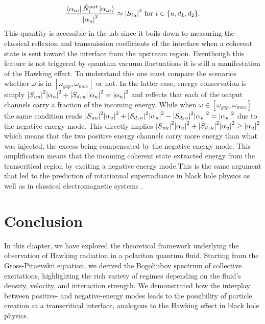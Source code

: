 \begin{equation}
    \dfrac{\bra{\alpha_{in}}\hat{N}_i^{out}\ket{\alpha_{in}}}{\abs{\alpha_u}^2} \approx \abs{S_{i u}}^2 \ \mathrm{for} \ i\in\{u,d_1,d_2\}.
\end{equation}
This quantity is accessible in the lab since it boils down to measuring the classical reflexion and transmission coefficients of the interface when a
coherent state is sent toward the interface from the upstream region. Eventhough this feature is not triggered by quantum vacuum 
fluctuations it is still a manifestation of the Hawking effect. To understand this one must compare the scenarios
whether $\omega$ is in $[\omega_{gap}, \omega_{max}]$ or not. In the latter case, energy conservation is simply $\abs{S_{uu}}^2\abs{\alpha_u}^2+\abs{S_{d_1u}}\abs{\alpha_u}^2=\abs{\alpha_u}^2$ and reflects that each of the output channels
carry a fraction of the incoming energy. While when $\omega \in [\omega_{gap}, \omega_{max}]$ the same condition reads $\abs{S_{uu}}^2\abs{\alpha_u}^2+\abs{S_{d_1u}}^2\abs{\alpha_u}^2-\abs{S_{d_2u}}^2\abs{\alpha_u}^2=\abs{\alpha_u}^2$ due to the negative energy mode.
This directly implies $\abs{S_{uu}}^2\abs{\alpha_u}^2+\abs{S_{d_1u}}^2\abs{\alpha_u}^2\geq \abs{\alpha_u}^2$ which means that the two positive energy channels
carry more energy than what was injected, the excess being compensated by the negative energy mode. This amplification means that the incoming 
coherent state extracted energy from the transcritical region by exciting a negative energy mode.This is the same 
argument that led to the prediction of rotationnal superradiance in black hole physics \cite{hawking_black_1972} as well as in classical electromagnetic systems \cite{zeldovich__1970}.

\section{Conclusion}

In this chapter, we have explored the theoretical framework underlying the observation of Hawking radiation in a polariton quantum fluid. Starting from the Gross-Pitaevskii equation, we derived the Bogoliubov spectrum of collective excitations, highlighting the rich variety of regimes depending on the fluid's density, velocity, and interaction strength. We demonstrated how the interplay between positive- and negative-energy modes leads to the possibility of particle creation at a transcritical interface, analogous to the Hawking effect in black hole physics.

